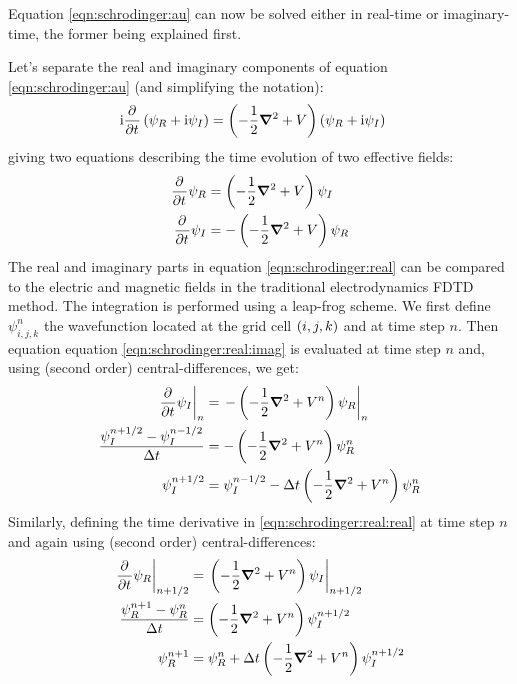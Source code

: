 Equation \eqref{eqn:schrodinger:au} can now be solved either in real-time or
imaginary-time, the former being explained first.

Let's separate the real and imaginary components of equation
\eqref{eqn:schrodinger:au} (and simplifying the notation):
\begin{align}
\textrm{i} \frac{\partial^{{}}   }{\partial t^{{}}} \left(  \psi_R + \textrm{i} \psi_I \right)
    & = \left( -\frac{1}{2} \bm{\nabla}^2 + V  \right)
        \left(  \psi_R + \textrm{i} \psi_I \right)
\end{align}
giving two equations describing the time evolution of two effective fields:
\begin{subequations}
\begin{align}
\frac{\partial^{{}}   }{\partial t^{{}}} \psi_R & =   \left( -\frac{1}{2} \bm{\nabla}^2 + V  \right) \psi_I
\label{eqn:schrodinger:real:real} \\
\frac{\partial^{{}}   }{\partial t^{{}}} \psi_I & = - \left( -\frac{1}{2} \bm{\nabla}^2 + V  \right) \psi_R
\label{eqn:schrodinger:real:imag}
\end{align}
\label{eqn:schrodinger:real}
\end{subequations}
The real and imaginary parts in equation \eqref{eqn:schrodinger:real} can be
compared to the electric and magnetic fields in the traditional electrodynamics
FDTD method. The integration is performed using a leap-frog scheme. We
first define $\psi_{i,j,k}^{n}$ the wavefunction located at the grid cell
$\left( i,j,k \right)$ and at time step $n$. Then equation equation
\eqref{eqn:schrodinger:real:imag} is evaluated at time step $n$ and, using
(second order) central-differences, we get:
\begin{align}
\left. \frac{\partial^{{}}   }{\partial t^{{}}} \psi_I \right|_{n}
& = \left. - \left( -\frac{1}{2} \bm{\nabla}^2 + V^{n}  \right) \psi_R \right|_{n} \\
\frac{\psi_{I}^{n+1/2} - \psi_{I}^{n-1/2}}{\Delta t}
& = - \left( -\frac{1}{2} \bm{\nabla}^2 + V^{n}  \right) \psi_{R}^{n} \\
\psi_{I}^{n+1/2}
& = \psi_{I}^{n-1/2} - \Delta t \left( -\frac{1}{2} \bm{\nabla}^2 + V^{n}  \right)
\psi_{R}^{n}
\label{eqn:schrodinger:real:imag:discretized}
\end{align}
Similarly, defining the time derivative in \eqref{eqn:schrodinger:real:real} at
time step $n$ and again using (second order) central-differences:
\begin{align}
\left. \frac{\partial^{{}}   }{\partial t^{{}}} \psi_R \right|_{n+1/2}
& = \left. \left( -\frac{1}{2} \bm{\nabla}^2 + V^{n}  \right) \psi_I \right|_{n+1/2} \\
\frac{\psi_{R}^{n+1} - \psi_{R}^{n}}{\Delta t}
& = \left( -\frac{1}{2} \bm{\nabla}^2 + V^{n}  \right) \psi_{I}^{n+1/2} \\
\psi_{R}^{n+1}
& = \psi_{R}^{n} + \Delta t \left( -\frac{1}{2} \bm{\nabla}^2 + V^{n}  \right)
\psi_{I}^{n+1/2}
\label{eqn:schrodinger:real:real:discretized}
\end{align}

